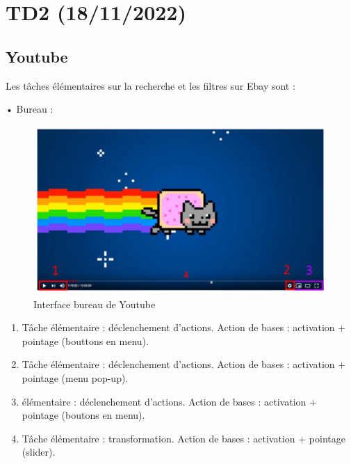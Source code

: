 \documentclass{article}
\begin{document}
\newpage


\section{TD2 (18/11/2022)}


\subsection{Youtube}
\quad Les tâches élémentaires sur la recherche et les filtres sur Ebay sont :\newline

• Bureau :
\begin{figure}[H]
    \centering
    \includegraphics[width=0.8\linewidth]{Youtube_desktop.jpeg}
    \caption{Interface bureau de Youtube}
\end{figure}

\vspace{1cm}

\begin{enumerate}[label=\arabic*)]
    \item Tâche élémentaire : déclenchement d'actions. Action de bases : activation + pointage (bouttons en menu).
    \item  Tâche élémentaire : déclenchement d'actions. Action de bases : activation + pointage (menu pop-up).
    \item  élémentaire : déclenchement d'actions. Action de bases : activation + pointage (boutons en menu).
    \item Tâche élémentaire : transformation. Action de bases : activation + pointage (slider).
\end{enumerate}

\clearpage
\end{document}
